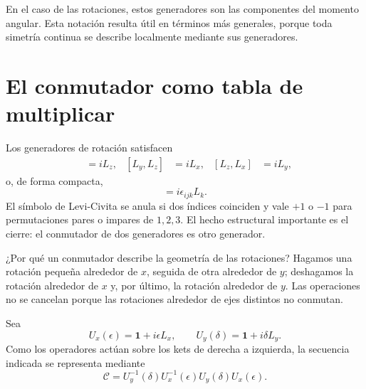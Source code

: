 En el caso de las rotaciones, estos generadores son las componentes del momento angular. Esta notación resulta útil en términos más generales, porque toda simetría continua se describe localmente mediante sus generadores.

\section{El conmutador como tabla de multiplicar}

Los generadores de rotación satisfacen
\begin{align}
[L_x,L_y]&=iL_z,&
[L_y,L_z]&=iL_x,&
[L_z,L_x]&=iL_y,
\end{align}
o, de forma compacta,
\begin{equation}
[L_i,L_j]=i\epsilon_{ijk}L_k.
\end{equation}
El símbolo de Levi-Civita se anula si dos índices coinciden y vale \(+1\) o \(-1\) para permutaciones pares o impares de \(1,2,3\). El hecho estructural importante es el cierre: el conmutador de dos generadores es otro generador.

¿Por qué un conmutador describe la geometría de las rotaciones? Hagamos una rotación pequeña alrededor de \(x\), seguida de otra alrededor de \(y\); deshagamos la rotación alrededor de \(x\) y, por último, la rotación alrededor de \(y\). Las operaciones no se cancelan porque las rotaciones alrededor de ejes distintos no conmutan.

\begin{classroomqa}
\end{classroomqa}

Sea
\begin{equation}
U_x(\epsilon)=\mathbf 1+i\epsilon L_x,
\qquad
U_y(\delta)=\mathbf 1+i\delta L_y.
\end{equation}
Como los operadores actúan sobre los kets de derecha a izquierda, la secuencia indicada se representa mediante
\begin{equation}
\mathcal C
=U_y^{-1}(\delta)U_x^{-1}(\epsilon)
 U_y(\delta)U_x(\epsilon).
\end{equation}

